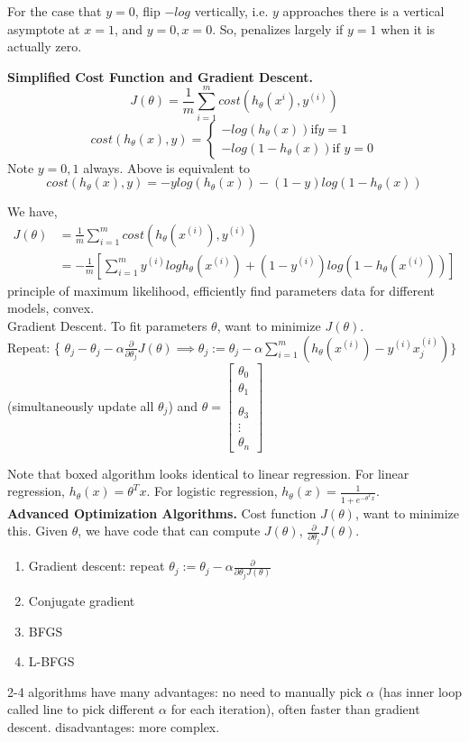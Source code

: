 \documentclass[a4 paper, 11 pt]{article}
\begin{document}
For the case that $y=0$, flip $-log$ vertically, i.e. $y$ approaches there is a vertical asymptote at $x=1$, and $y=0, x = 0$. So, penalizes largely if $y=1$ when it is actually zero.

\textbf{Simplified Cost Function and Gradient Descent.}
\[
J(\theta) = \frac{1}{m}\sum_{i=1}^m cost(h_\theta(x^{i}),y^{(i)})
\]
\[
cost(h_\theta(x), y) = \begin{cases}-log(h_\theta(x)) \mbox{if} y = 1 \\ -log(1-h_\theta(x)) \mbox{if } y=0\end{cases}
\]
Note $y=0,1$ always. Above is equivalent to
\[
cost(h_\theta(x),y) = -y log(h_\theta(x)) - (1-y)log(1-h_\theta(x))
\]

We have,
\begin{align*}
J(\theta) &= \frac{1}{m}\sum_{i=1}^m cost(h_\theta(x^{(i)}), y^{(i)}) \\
&= \boxed{-\frac{1}{m}\left[\sum_{i=1}^m y^{(i)} log h_\theta(x^{(i)}) + (1 - y^{(i)}) log (1 - h_\theta(x^{(i)}))\right]}
\end{align*}
principle of maximum likelihood, efficiently find parameters data for different models, convex.\\

Gradient Descent. To fit parameters $\theta$, want to minimize $J(\theta)$.\\
Repeat: \{ $\theta_j - \theta_j - \alpha \frac{\partial}{\partial \theta_j}J(\theta) \implies \boxed{\theta_j := \theta_j - \alpha \sum_{i=1}^m (h_\theta(x^{(i)}) - y^{(i)}x_j^{(i)} )}\}$ (simultaneously update all $\theta_j$)
and $\theta = \begin{bmatrix}\theta_0 \\ \theta_1 \\ \\ \theta_3 \\ \vdots \\ \theta_n \end{bmatrix}$

Note that boxed algorithm looks identical to linear regression. For linear regression, $h_\theta(x) = \theta^Tx$. For logistic regression, $h_\theta(x) = \frac{1}{1+e^{-\theta^Tx}}$.\\

\textbf{Advanced Optimization Algorithms.} Cost function $J(\theta)$, want to minimize this. Given $\theta$, we have code that can compute $J(\theta)$, $\frac{\partial}{\partial \theta_j}J(\theta)$.
\begin{enumerate}
\item Gradient descent: repeat $\theta_j := \theta_j - \alpha \frac{\partial}{\partial\theta_j J(\theta)}$
\item Conjugate gradient
\item BFGS
\item L-BFGS
\end{enumerate}
2-4 algorithms have many advantages: no need to manually pick $\alpha$ (has inner loop called line to pick different $\alpha$ for each iteration), often faster than gradient descent. disadvantages: more complex.
\end{document}
